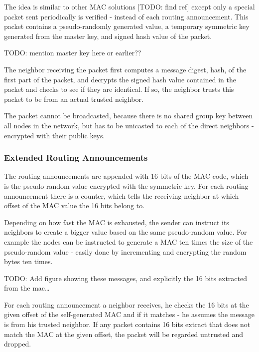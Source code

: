 The idea is similar to other \ac{MAC} solutions [TODO: find ref] except only a
special packet sent periodically is verified - instead of each routing announcement.
This packet contains a pseudo-randomly generated value, a temporary symmetric
key generated from the master key, and signed hash value of the packet.

TODO: mention master key here or earlier??

The neighbor receiving the packet first computes a message digest, hash, of the
first part of the packet, and decrypts the signed hash value contained in the
packet and checks to see if they are identical. If so, the neighbor trusts this
packet to be from an actual trusted neighbor.

The packet cannot be broadcasted, because there is no shared group key between
all nodes in the network, but has to be unicasted to each of the direct
neighbors - encrypted with their public keys.

\subsubsection*{Extended Routing Announcements}

The routing announcements are appended with 16 bits of the \ac{MAC} code, which
is the pseudo-random value encrypted with the symmetric key. For each routing
announcement there is a counter, which tells the receiving neighbor at which
offset of the \ac{MAC} value the 16 bits belong to.

Depending on how fast the \ac{MAC} is exhausted, the sender can instruct its
neighbors to create a bigger value based on the same pseudo-random value. For
example the nodes can be instructed to generate a \ac{MAC} ten times the size of
the pseudo-random value - easily done by incrementing and encrypting the random
bytes ten times.

TODO: Add figure showing these messages, and explicitly the 16 bits extracted
from the mac\ldots

For each routing announcement a neighbor receives, he checks the 16 bits at the
given offset of the self-generated \ac{MAC} and if it matches - he assumes the
message is from his trusted neighbor. If any packet contains 16 bits extract
that does not match the \ac{MAC} at the given offset, the packet will be
regarded untrusted and dropped.

